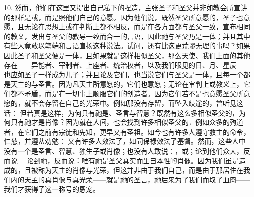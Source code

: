 10. 然而，他们在这里又提出自己私下的捏造，主张圣子和圣父并非如教会所宣讲的那样是或，而是照他们自己的意愿。因为他们说，既然圣父所意愿的，圣子也意愿，且无论在思想上或在判断上都不相反，而是在各方面都与圣父一致，宣布相同的教义，发出与圣父的教导一致而合一的言语，因此祂与圣父乃是一体；并且其中有些人竟敢以笔端和言语宣扬这种说法。试问，还有比这更荒谬无理的事吗？如果因此圣子和圣父便是一体，且如果就是这样相似圣父，那么天使、我们上面的其他存在——异能者、宰制者、上座者、统治权者，以及我们眼见的日、月、星辰——也应如圣子一样成为儿子；并且论及它们，也当说它们与圣父是一体，且每一个都是天主的与圣言。因为凡天主所意愿的，它们也意愿；无论在审判上或教义上，它们都不矛盾，而是在一切事上顺服它们的创造者。因为它们若不是也意愿圣父所意愿的，就不会存留在自己的光荣中。例如那没有存留，而坠入歧途的，曾听见这话： 但若真是这样，为何只有祂是、圣言与智慧？既然有这么多相似圣父的，为何只有祂才是肖像？因为就在人间，也会找到许多相似圣父的，例如众多的殉道者，在它们之前有宗徒和先知，更早又有圣祖。如今也有许多人遵守救主的命令，仁慈，并遵从劝勉： 又有许多人效法了，如同保禄效法了基督。然而，这些人中没有一个是圣言、智慧、独生子或肖像；也没有人敢说：，或；论到他们众人，反而说： 论到祂，反而说：唯有祂是圣父真实而生自本性的肖像。因为我们虽是造成的，且被称为天主的肖像与光荣，但这并非由于我们自己，而是由于那居住在我们内的天主的真肖像与真光荣——就是祂的圣言，祂后来为了我们而取了血肉——我们才获得了这一称号的恩宠。\par

